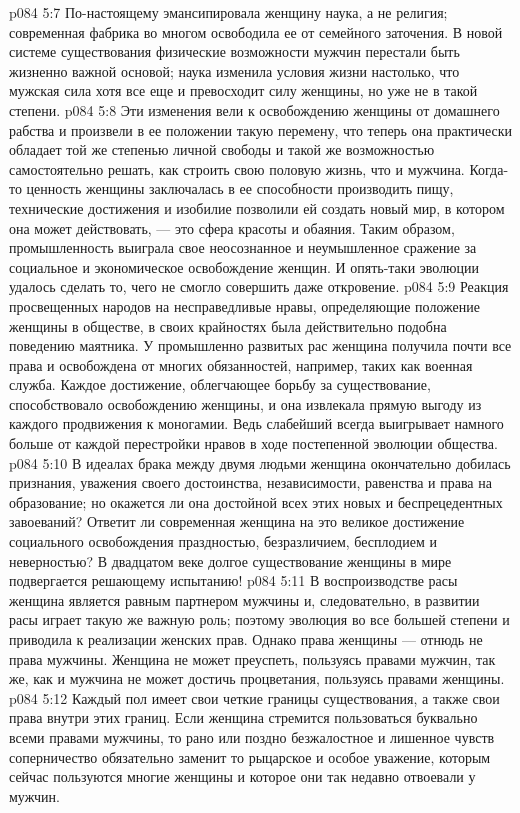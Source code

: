\vs p084 5:7 \pc По\hyp{}настоящему эмансипировала женщину наука, а не религия; современная фабрика во многом освободила ее от семейного заточения. В новой системе существования физические возможности мужчин перестали быть жизненно важной основой; наука изменила условия жизни настолько, что мужская сила хотя все еще и превосходит силу женщины, но уже не в такой степени.
\vs p084 5:8 Эти изменения вели к освобождению женщины от домашнего рабства и произвели в ее положении такую перемену, что теперь она практически обладает той же степенью личной свободы и такой же возможностью самостоятельно решать, как строить свою половую жизнь, что и мужчина. Когда\hyp{}то ценность женщины заключалась в ее способности производить пищу, технические достижения и изобилие позволили ей создать новый мир, в котором она может действовать, --- это сфера красоты и обаяния. Таким образом, промышленность выиграла свое неосознанное и неумышленное сражение за социальное и экономическое освобождение женщин. И опять\hyp{}таки эволюции удалось сделать то, чего не смогло совершить даже откровение.
\vs p084 5:9 \pc Реакция просвещенных народов на несправедливые нравы, определяющие положение женщины в обществе, в своих крайностях была действительно подобна поведению маятника. У промышленно развитых рас женщина получила почти все права и освобождена от многих обязанностей, например, таких как военная служба. Каждое достижение, облегчающее борьбу за существование, способствовало освобождению женщины, и она извлекала прямую выгоду из каждого продвижения к моногамии. Ведь слабейший всегда выигрывает намного больше от каждой перестройки нравов в ходе постепенной эволюции общества.
\vs p084 5:10 В идеалах брака между двумя людьми женщина окончательно добилась признания, уважения своего достоинства, независимости, равенства и права на образование; но окажется ли она достойной всех этих новых и беспрецедентных завоеваний? Ответит ли современная женщина на это великое достижение социального освобождения праздностью, безразличием, бесплодием и неверностью? В двадцатом веке долгое существование женщины в мире подвергается решающему испытанию!
\vs p084 5:11 В воспроизводстве расы женщина является равным партнером мужчины и, следовательно, в развитии расы играет такую же важную роль; поэтому эволюция во все большей степени и приводила к реализации женских прав. Однако права женщины --- отнюдь не права мужчины. Женщина не может преуспеть, пользуясь правами мужчин, так же, как и мужчина не может достичь процветания, пользуясь правами женщины.
\vs p084 5:12 Каждый пол имеет свои четкие границы существования, а также свои права внутри этих границ. Если женщина стремится пользоваться буквально всеми правами мужчины, то рано или поздно безжалостное и лишенное чувств соперничество обязательно заменит то рыцарское и особое уважение, которым сейчас пользуются многие женщины и которое они так недавно отвоевали у мужчин.
